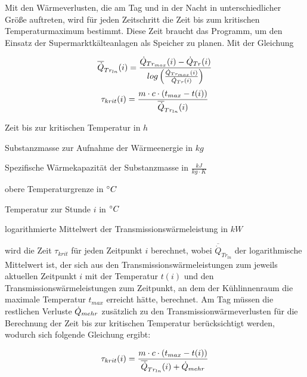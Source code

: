 Mit den Wärmeverlusten, die am Tag und in der Nacht in unterschiedlicher Größe
auftreten, wird für jeden Zeitschritt die Zeit bis zum kritischen
Temperaturmaximum bestimmt. Diese Zeit braucht das Programm, um den Einsatz der
Supermarktkälteanlagen als Speicher zu planen. Mit der Gleichung

\begin{equation}
	\aptranslog(i) = \frac{ \ptransm(i) - \ptrans(i) }{log \left(
		\frac{\ptransm(i)}{\ptrans(i)} \right)}
	\label{log}
\end{equation}
\begin{equation}
	\tau_{krit}(i) = \frac{m \cdot c \cdot (t_{max} -
		t(i))}{\aptranslog(i)}
\label{taukn}
\end{equation}

\begin{description}[\dth]

	\item[$\tau_{krit}$] Zeit bis zur kritischen Temperatur in $h$
	\item[$m$] Substanzmasse zur Aufnahme der Wärmeenergie in $kg$
	\item[$c$] Spezifische Wärmekapazität der Substanzmasse in $\frac{kJ}{kg
		\cdot K}$
	\item[$t_{max}$] obere Temperaturgrenze in $ ^\circ C $
	\item[$t(i)$] Temperatur zur Stunde $i$ in $ ^\circ C $
	\item[$\aptranslog$] logarithmierte Mittelwert der
		Transmissionswärmeleistung in $kW$
\end{description}
\vspace{0.5cm}


wird die Zeit $\tau_{krit}$ für jeden Zeitpunkt $i$ berechnet, wobei
$\overline{\dot{Q}}_{Tr_{ln}}$ der logarithmische Mittelwert ist, der sich aus
den Transmissionswärmeleistungen zum jeweils aktuellen Zeitpunkt $i$ mit der
Temperatur $t(i)$ und den Transmissionswärmeleistungen zum Zeitpunkt, an dem der
Kühlinnenraum die maximale Temperatur $t_{max}$ erreicht hätte, berechnet. Am
Tag müssen die restlichen Verluste $\dot{Q}_{mehr}$ zusätzlich zu den
Transmissionwärmeverlusten für die Berechnung der Zeit bis zur kritischen
Temperatur berücksichtigt werden, wodurch sich folgende Gleichung ergibt:

\begin{equation}
	\tau_{krit}(i) = \frac{m \cdot c \cdot (t_{max} -
		t(i))}{\aptranslog(i) + \pmehr}
\label{taukd}
\end{equation}

